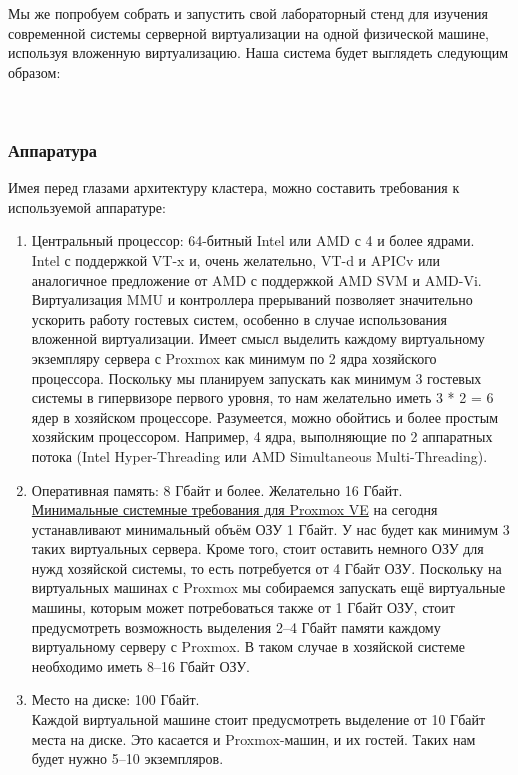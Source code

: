 \documentclass[14pt, a4paper]{article}
\begin{document}
Мы же попробуем собрать и запустить свой лабораторный стенд для изучения современной системы
серверной виртуализации на одной физической машине, используя вложенную виртуализацию. Наша
система будет выглядеть следующим образом:

\begin{figure}[h]
    \centering
    \\ 
    \label{framework} 
\end{figure}

\subsubsection*{Аппаратура} 

Имея перед глазами архитектуру кластера, можно составить требования к используемой аппаратуре:
\begin{enumerate}
    \item Центральный процессор: 64-битный Intel или AMD с 4 и более ядрами.\\
    
    Intel с поддержкой VT-x и, очень желательно, VT-d и APICv или аналогичное предложение от
    AMD с поддержкой AMD SVM и AMD-Vi. Виртуализация MMU и контроллера прерываний
    позволяет значительно ускорить работу гостевых систем, особенно в случае использования
    вложенной виртуализации. Имеет смысл выделить каждому виртуальному экземпляру
    сервера с Proxmox как минимум по 2 ядра хозяйского процессора. Поскольку мы планируем
    запускать как минимум 3 гостевых системы в гипервизоре первого уровня, то нам желательно
    иметь 3 * 2 = 6 ядер в хозяйском процессоре. Разумеется, можно обойтись и более простым
    хозяйским процессором. Например, 4 ядра, выполняющие по 2 аппаратных потока (Intel
    Hyper-Threading или AMD Simultaneous Multi-Threading).
    \item Оперативная память: 8 Гбайт и более. Желательно 16 Гбайт.\\
    
    \href{https://pve.proxmox.com/wiki/System_Requirements}{Минимальные системные требования для Proxmox VE} на сегодня устанавливают
    минимальный объём ОЗУ 1 Гбайт. У нас будет как минимум 3 таких виртуальных сервера.
    Кроме того, стоит оставить немного ОЗУ для нужд хозяйской системы, то есть потребуется от
    4 Гбайт ОЗУ. Поскольку на виртуальных машинах с Proxmox мы собираемся запускать ещё
    виртуальные машины, которым может потребоваться также от 1 Гбайт ОЗУ, стоит
    предусмотреть возможность выделения 2–4 Гбайт памяти каждому виртуальному серверу с
    Proxmox. В таком случае в хозяйской системе необходимо иметь 8–16 Гбайт ОЗУ.
    \item Место на диске: 100 Гбайт.\\
    
    Каждой виртуальной машине стоит предусмотреть выделение от 10 Гбайт места на диске. Это
    касается и Proxmox-машин, и их гостей. Таких нам будет нужно 5–10 экземпляров.
\end{enumerate}
\end{document}
